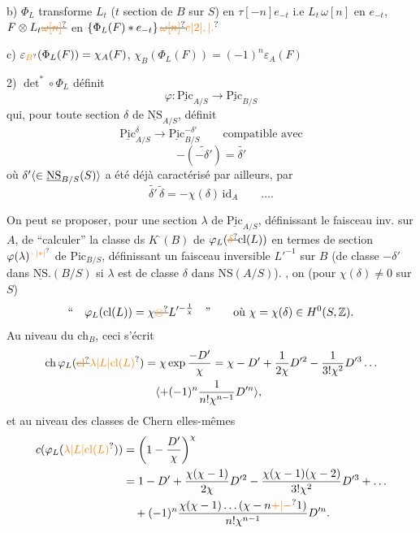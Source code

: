 b) $\Phi_L$ transforme  $L_t$ ($t$ section de $B$ sur $S$) en $\tau[-n]e_{-t}$ i.e $L_t\,\omega[n]$ en $e_{-t}$,  $F\otimes L_t\deleted{\unsure{\omega[n]}}$ en $\left\{\Phi_L(F)*e_{-t}\right\}\deleted{\unsure{\omega[n]}}\unsure{e|2|,|.}$

c) $\varepsilon_{\unsure{B}}(\Phi_L(F))=\chi_A(F)$, $\chi_B(\Phi_L(F))=(-1)^n\varepsilon_A(F)$

2) $\det^*\circ\Phi_L$ définit 
\[
\varphi\colon\underline{\mathrm{Pic}}_{A/S}\longrightarrow\underline{\mathrm{Pic}}_{B/S}
\]
qui, pour toute section $\delta$ de $\underline{\mathrm{NS}}_{A/S}$, définit
\[
\underline{\mathrm{Pic}}^\delta_{A/S}\longrightarrow\underline{\mathrm{Pic}}^{-\delta'}_{B/S}\qquad\text{compatible avec}
\]
\[
-(\widetilde{-\delta'})=\widetilde{\delta'}
\]
où $\delta'\inserted{\in\underline{\mathrm{NS}}_{B/S}(S)}$ a été déjà caractérisé par ailleurs, par
\[
\widetilde{\delta'}\,\widetilde\delta=-\chi(\delta)\,\mathrm{id}_A\qquad\ldots.
\]

On peut se proposer, pour une section $\lambda$ de $\underline{\mathrm{Pic}}_{A/S}$, définissant le faisceau inv. sur $A$, de ``calculer'' la classe ds $K^{\cdot}(B)$ de $\varphi_L(\deleted{\unsure{\delta}}\mathrm{cl}(L))$ en termes de   section $\varphi(\lambda)^{\unsure{\,\cdot\,|*|\vphantom{*}}}$ de $\mathrm{Pic}_{B/S}$, définissant un faisceau inversible $L'^{-1}$ sur $B$ (de classe $-\delta'$ dans $\underline{\mathrm{NS}}.(B/S)$ si $\lambda$ est de classe $\delta$ dans $\mathrm{NS}(A/S)$). , on   (pour $\chi(\delta)\ne0$  sur $S$)
\[
\text{``}\quad\varphi_L(\mathrm{cl}(L))=\chi\deleted{\unsure{\otimes}}L'^{-\frac1\chi}\quad\text{''}
\qquad\text{où }\chi=\chi(\delta)\in H^0(S,\mathbb Z).
\]
Au niveau du $\mathrm{ch}_B$, ceci s'écrit
\[
\begin{aligned}
\mathrm{ch}\,\varphi_L(\deleted{\unsure{\mathrm{cl}}}\unsure{\lambda|L|\mathrm{cl}(L)})&=\chi\exp\frac{-D'}{\chi}=\chi-D'+\frac1{2\chi}D'^{2}-\frac1{3!\chi^2}D'^{3}\ldots\\
&\quad\inserted{+(-1)^n\frac1{n!\chi^{n-1}}D'^{n}},
\end{aligned}
\]
et au niveau des classes de Chern elles-mêmes
\[
\begin{aligned}
c(\varphi_L(\unsure{\lambda|L|\mathrm{cl}(L)}))&=\left(1-\frac{D'}{\chi}\right)^\chi\\
&=1-D'+\frac{\chi(\chi-1)}{2\chi}D'^{2}-\frac{\chi(\chi-1)(\chi-2)}{3!\chi^2}D'^{3}+\ldots\\
&\quad+(-1)^n\frac{\chi(\chi-1)\ldots(\chi-n\unsure{+|-}1)}{n!\chi^{n-1}}D'^{n}.
\end{aligned}
\]

